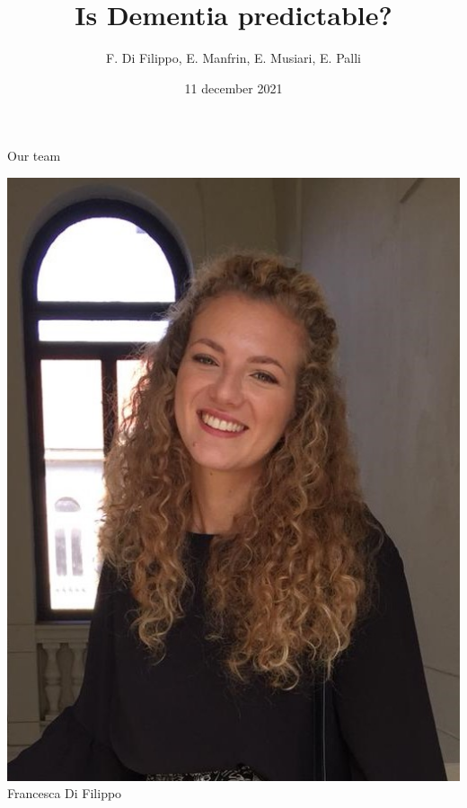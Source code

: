 \documentclass{beamer}
\title{Is Dementia predictable?}
\author{F. Di Filippo, E. Manfrin, E. Musiari, E. Palli}
\date{11 december 2021}
\begin{document}
\begin{frame}
\maketitle
\end{frame}


\begin{frame}{Our team}
	\begin{minipage}{0.24\textwidth}
		\vspace{0.55cm}
		\begin{center}%
			\includegraphics[width=\columnwidth]{francescataglio.jpeg}
			Francesca Di Filippo
		\end{center}
	\end{minipage}
\hfill
	\begin{minipage}{0.24\textwidth}
		\begin{center}%

\end{center}
\end{minipage}
\end{frame}
\end{document}
